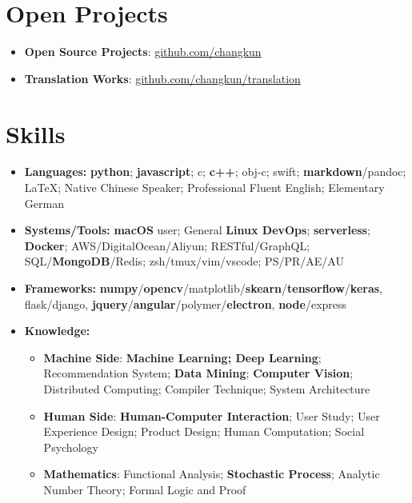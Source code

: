 \documentclass[letterpaper,11pt]{article}
\newcommand{\resumeItem}[2]{
  \item\small{
    \textbf{#1}{: #2 \vspace{-2pt}}
  }
}
\newcommand{\resumeSubItem}[2]{\resumeItem{#1}{#2}\vspace{-4pt}}
\newcommand{\resumeSubHeadingListStart}{\begin{itemize}[leftmargin=*]}
\newcommand{\resumeSubHeadingListEnd}{\end{itemize}}
\newcommand{\resumeItemListStart}{\begin{itemize}}
\newcommand{\resumeItemListEnd}{\end{itemize}\vspace{-5pt}}
\begin{document}
\section{Open Projects}
  \resumeSubHeadingListStart
    \resumeSubItem{Open Source Projects}
      {\href{https://github.com/changkun/}{github.com/changkun}}
    \resumeSubItem{Translation Works}
      {\href{https://github.com/changkun/translation}{github.com/changkun/translation}}
  \resumeSubHeadingListEnd
\section{Skills}
 \resumeSubHeadingListStart
   \item{
     \textbf{Languages:}{ 
      \textbf{python}; \textbf{javascript}; 
      c; \textbf{c++}; obj-c; swift; 
      \textbf{markdown}/pandoc; \LaTeX; 
      Native Chinese Speaker; Professional Fluent English; Elementary German
     }
   }
   \item{
    \textbf{Systems/Tools:}{ 
      \textbf{macOS} user; General \textbf{Linux DevOps}; \textbf{serverless};
      \textbf{Docker}; AWS/DigitalOcean/Aliyun; 
      RESTful/GraphQL;
      SQL/\textbf{MongoDB}/Redis; 
      zsh/tmux/vim/vscode; 
      PS/PR/AE/AU
    }
   }
   \item{
    \textbf{Frameworks:}{ 
      \textbf{numpy}/\textbf{opencv}/matplotlib/\textbf{skearn}/\textbf{tensorflow}/\textbf{keras}, 
      flask/django, 
      \textbf{jquery}/\textbf{angular}/polymer/\textbf{electron}, 
      \textbf{node}/express
    }
   }
   \item{
     \textbf{Knowledge:}{ 
       \resumeItemListStart
        \resumeItem{Machine Side}
        { 
          \textbf{Machine Learning; Deep Learning};
          Recommendation System; 
          \textbf{Data Mining}; 
          \textbf{Computer Vision}; 
          Distributed Computing; 
          Compiler Technique; 
          System Architecture
        }
        \resumeItem{Human Side}
          { 
            \textbf{Human-Computer Interaction}; 
            User Study; 
            User Experience Design; 
            Product Design; 
            Human Computation; 
            Social Psychology
          }
        \resumeItem{Mathematics}
          { 
            Functional Analysis; 
            \textbf{Stochastic Process}; 
            Analytic Number Theory; 
            Formal Logic and Proof
          }
      \resumeItemListEnd
     }
   }
 \resumeSubHeadingListEnd
\end{document}
